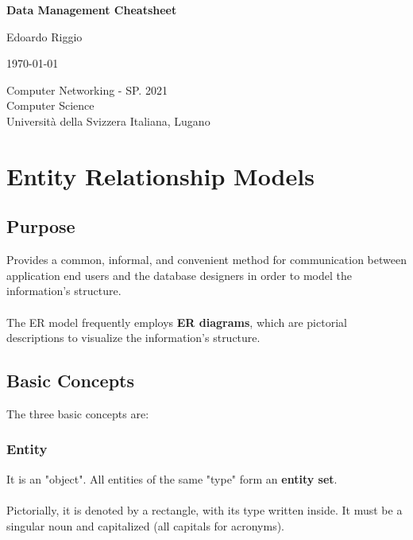\documentclass{article}
\begin{document}
\begin{titlepage}
    \begin{center}
        \vspace*{1cm}
        
        \Huge
        \textbf{Data Management Cheatsheet}
        
        \vspace{0.5cm}
        \LARGE
        
        \vspace{.5cm}
        
        Edoardo Riggio
   		  \vspace{1.5cm}
       
        \vfill
        
        \today
        
        \vspace{.8cm}
          \Large
          Computer Networking - SP. 2021 \\
        Computer Science\\
        Universit\`{a} della Svizzera Italiana, Lugano\\
        
    \end{center}
\end{titlepage}

\tableofcontents

\newpage

\section{Entity Relationship Models}
\subsection{Purpose}
Provides a common, informal, and convenient method for communication between application end users and the database designers in order to model the information's structure. \\ \\
The ER model frequently employs \textbf{ER diagrams}, which are pictorial descriptions to visualize the information's structure.

\subsection{Basic Concepts}
The three basic concepts are:
\subsubsection{Entity}
It is an "object". All entities of the same "type" form an \textbf{entity set}. \\ \\
Pictorially, it is denoted by a rectangle, with its type written inside. It must be a singular noun and capitalized (all capitals for acronyms). \\ \\
\end{document}
